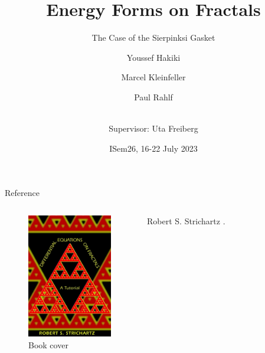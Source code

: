 \documentclass[notheorems]{beamer}
\title{Energy Forms on Fractals}
\subtitle{The Case of the Sierpinksi Gasket}
\author %
{Youssef Hakiki\inst{1} \and Marcel Kleinfeller\inst{2} \and Paul Rahlf\inst{3} \and \\[3mm] {\small Supervisor: Uta Freiberg\inst{4}}}
\institute[VFU] %
{
  \inst{1}%
  Cadi Ayyad University
  \and
  \inst{2}%
  Technical University of Darmstadt
  \and
  \inst{3}%
  Kiel University
  \and
  \inst{4}%
  Chemnitz University of Technology
}
\date %
{ISem26, 16-22 July 2023}
\theoremstyle{definition}
\theoremstyle{plain}
\theoremstyle{remark}
\newcommand{\1}{\mathds{1}} %
\begin{document}
\begin{frame}
    \titlepage
\end{frame}


\begin{frame}{Reference}
  \begin{columns}[c]
    \begin{figure}
        \centering
        \includegraphics[width=10em]{images/book.pdf}
        \caption{Book cover}
    \end{figure}
    \begin{thebibliography}{10}
      \alert{Robert S. Strichartz}
      .
    \end{thebibliography}
\end{columns}
\end{frame}




\end{document}
